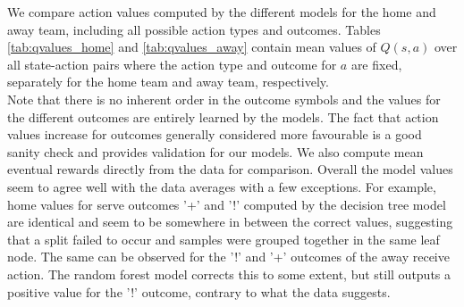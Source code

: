 \documentclass{sfuthesis}
\begin{document}
	We compare action values computed by the different models for the home and away team, including all possible action types and outcomes. Tables \ref{tab:qvalues_home} and \ref{tab:qvalues_away} contain mean values of $Q(s,a)$ over all state-action pairs where the action type and outcome for $a$ are fixed, separately for the home team and away team, respectively.\\
	Note that there is no inherent order in the outcome symbols and the values for the different outcomes are entirely learned by the models. The fact that action values increase for outcomes generally considered more favourable is a good sanity check and provides validation for our models. We also compute mean eventual rewards directly from the data for comparison. Overall the model values seem to agree well with the data averages with a few exceptions. For example, home values for serve outcomes '+' and '!' computed by the decision tree model are identical and seem to be somewhere in between the correct values, suggesting that a split failed to occur and samples were grouped together in the same leaf node. The same can be observed for the '!' and '+' outcomes of the away receive action. The random forest model corrects this to some extent, but still outputs a positive value for the '!' outcome, contrary to what the data suggests.
	
\end{document}

